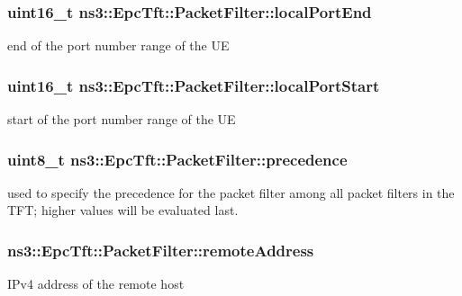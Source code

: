 \subsubsection[{\texorpdfstring{local\+Port\+End}{localPortEnd}}]{\setlength{\rightskip}{0pt plus 5cm}uint16\+\_\+t ns3\+::\+Epc\+Tft\+::\+Packet\+Filter\+::local\+Port\+End}\hypertarget{structns3_1_1EpcTft_1_1PacketFilter_a3236947a93fdd516b1d978467eaa0484}{}\label{structns3_1_1EpcTft_1_1PacketFilter_a3236947a93fdd516b1d978467eaa0484}
end of the port number range of the UE 
\subsubsection[{\texorpdfstring{local\+Port\+Start}{localPortStart}}]{\setlength{\rightskip}{0pt plus 5cm}uint16\+\_\+t ns3\+::\+Epc\+Tft\+::\+Packet\+Filter\+::local\+Port\+Start}\hypertarget{structns3_1_1EpcTft_1_1PacketFilter_afd505cda437b1687abc4432a8bcefbaf}{}\label{structns3_1_1EpcTft_1_1PacketFilter_afd505cda437b1687abc4432a8bcefbaf}
start of the port number range of the UE 
\subsubsection[{\texorpdfstring{precedence}{precedence}}]{\setlength{\rightskip}{0pt plus 5cm}uint8\+\_\+t ns3\+::\+Epc\+Tft\+::\+Packet\+Filter\+::precedence}\hypertarget{structns3_1_1EpcTft_1_1PacketFilter_a6130111e1cda6557576a202a3a0adaa2}{}\label{structns3_1_1EpcTft_1_1PacketFilter_a6130111e1cda6557576a202a3a0adaa2}
used to specify the precedence for the packet filter among all packet filters in the T\+FT; higher values will be evaluated last. 
\subsubsection[{\texorpdfstring{remote\+Address}{remoteAddress}}]{ ns3\+::\+Epc\+Tft\+::\+Packet\+Filter\+::remote\+Address}\hypertarget{structns3_1_1EpcTft_1_1PacketFilter_ac6b6b05436c19e55a9d64ff5d8ace9e5}{}\label{structns3_1_1EpcTft_1_1PacketFilter_ac6b6b05436c19e55a9d64ff5d8ace9e5}
I\+Pv4 address of the remote host 
